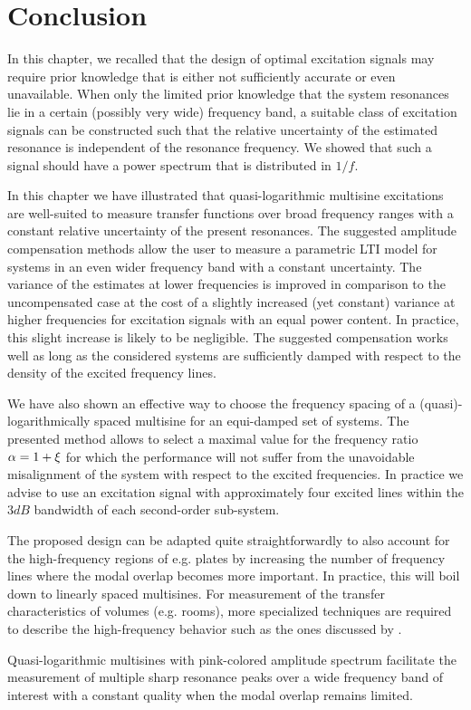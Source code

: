 \section{Conclusion}
\label{sec:excitation:conclusion}
In this chapter, we recalled that the design of optimal excitation signals may require prior knowledge that is either not sufficiently accurate or even unavailable.
When only the limited prior knowledge that the system resonances lie in a certain (possibly very wide) frequency band, a suitable class of excitation signals can be constructed such that the relative uncertainty of the estimated resonance is independent of the resonance frequency.
We showed that such a signal should have a power spectrum that is distributed in $1/f$.

In this chapter we have illustrated that quasi-logarithmic multisine excitations are well-suited to measure transfer functions over broad frequency ranges with a constant relative uncertainty of the present resonances.
The suggested amplitude compensation methods allow the user to measure a parametric \gls{LTI} model for systems in an even wider frequency band with a constant uncertainty.
The variance of the estimates at lower frequencies is improved in comparison to the uncompensated case at the cost of a slightly increased (yet constant) variance at higher frequencies for excitation signals with an equal power content.
In practice, this slight increase is likely to be negligible.
The suggested compensation works well as long as the considered systems are sufficiently damped with respect to the density of the excited frequency lines.

We have also shown an effective way to choose the frequency spacing of a (quasi)-logarithmically spaced multisine for an equi-damped set of systems.
The presented method allows to select a maximal value for the frequency ratio $\alpha = 1 + \xi_{}$ for which the performance will not suffer from the unavoidable misalignment of the system with respect to the excited frequencies.
In practice we advise to use an excitation signal with approximately four excited lines within the $3\unit{dB}$ bandwidth of each second-order sub-system.

\begin{remark}
The proposed design can be adapted quite straightforwardly to also account for the high-frequency regions of e.g. plates by increasing the number of frequency lines where the modal overlap becomes more important.
In practice, this will boil down to linearly spaced multisines.
For measurement of the transfer characteristics of volumes (e.g. rooms), more specialized techniques are required to describe the high-frequency behavior such as the ones discussed by \citet{Ege2009}.
\end{remark}

\begin{guideline}
  Quasi-logarithmic multisines with pink-colored amplitude spectrum facilitate the measurement of multiple sharp resonance peaks over a wide frequency band of interest with a constant quality when the modal overlap remains limited.
\end{guideline}
